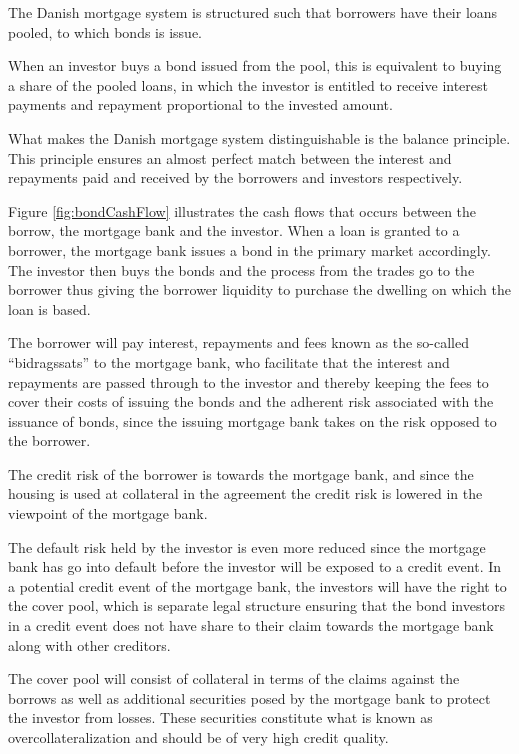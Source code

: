 \documentclass[12pt,twoside]{reedthesis}
\begin{document}
The Danish mortgage system is structured such that borrowers have their loans pooled, to which bonds is issue.

When an investor buys a bond issued from the pool, this is equivalent to buying a share of the pooled loans, in which the investor is entitled to receive interest payments and repayment proportional to the invested amount.

What makes the Danish mortgage system distinguishable is the balance principle. This principle ensures an almost perfect match between the interest and repayments paid and received by the borrowers and investors respectively.

Figure \ref{fig:bondCashFlow} illustrates the cash flows that occurs between the borrow, the mortgage bank and the investor. When a loan is granted to a borrower, the mortgage bank issues a bond in the primary market accordingly. The investor then buys the bonds and the process from the trades go to the borrower thus giving the borrower liquidity to purchase the dwelling on which the loan is based.

The borrower will pay interest, repayments and fees known as the so-called ``bidragssats'' to the mortgage bank, who facilitate that the interest and repayments are passed through to the investor and thereby keeping the fees to cover their costs of issuing the bonds and the adherent risk associated with the issuance of bonds, since the issuing mortgage bank takes on the risk opposed to the borrower.

The credit risk of the borrower is towards the mortgage bank, and since the housing is used at collateral in the agreement the credit risk is lowered in the viewpoint of the mortgage bank.

The default risk held by the investor is even more reduced since the mortgage bank has go into default before the investor will be exposed to a credit event. In a potential credit event of the mortgage bank, the investors will have the right to the cover pool, which is separate legal structure ensuring that the bond investors in a credit event does not have share to their claim towards the mortgage bank along with other creditors.

The cover pool will consist of collateral in terms of the claims against the borrows as well as additional securities posed by the mortgage bank to protect the investor from losses. These securities constitute what is known as overcollateralization and should be of very high credit quality.
\end{document}
